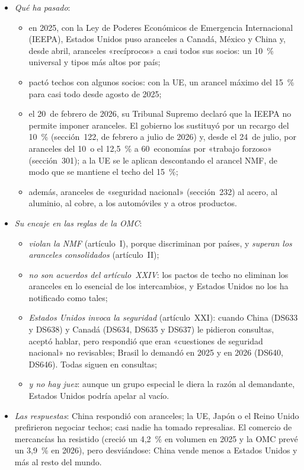 \documentclass[11pt]{article}
\begin{document}
\begin{itemize}
\item \emph{Qué ha pasado}\nocite{JonesDay2026IEEPA,USTR2026Seccion301}:
  \begin{itemize}
  \item en 2025, con la Ley de Poderes Económicos de Emergencia Internacional (IEEPA), Estados Unidos puso aranceles a Canadá, México y China y, desde abril, aranceles «recíprocos» a casi todos sus socios: un 10~\% universal y tipos más altos por país;
  \item pactó techos con algunos socios: con la UE, un arancel máximo del 15~\% para casi todo desde agosto de 2025\nocite{UE2025DeclaracionEEUU};
  \item el 20~de febrero de 2026, su Tribunal Supremo declaró que la IEEPA no permite imponer aranceles\nocite{JonesDay2026IEEPA}. El gobierno los sustituyó por un recargo del 10~\% (sección~122, de febrero a julio de 2026) y, desde el 24~de julio, por aranceles del 10~o el 12,5~\% a 60~economías por «trabajo forzoso» (sección~301); a la UE se le aplican descontando el arancel NMF, de modo que se mantiene el techo del 15~\%;
  \item además, aranceles de «seguridad nacional» (sección~232) al acero, al aluminio, al cobre, a los automóviles y a otros productos.
  \end{itemize}
\item \emph{Su encaje en las reglas de la OMC}:
  \begin{itemize}
  \item \emph{violan la NMF} (artículo~I), porque discriminan por países, y \emph{superan los aranceles consolidados} (artículo~II);
  \item \emph{no son acuerdos del artículo~XXIV}: los pactos de techo no eliminan los aranceles en lo esencial de los intercambios, y Estados Unidos no los ha notificado como tales;
  \item \emph{Estados Unidos invoca la seguridad} (artículo~XXI): cuando China (DS633 y DS638) y Canadá (DS634, DS635 y DS637) le pidieron consultas, aceptó hablar, pero respondió que eran «cuestiones de seguridad nacional» no revisables\nocite{TWN2025DS634}; Brasil lo demandó en 2025 y en 2026 (DS640, DS646). Todas siguen en consultas;
  \item \emph{y no hay juez}: aunque un grupo especial le diera la razón al demandante, Estados Unidos podría apelar al vacío.
  \end{itemize}
\item \emph{Las respuestas}: China respondió con aranceles; la UE, Japón o el Reino Unido prefirieron negociar techos; casi nadie ha tomado represalias. El comercio de mercancías ha resistido (creció un 4,2~\% en volumen en 2025 y la OMC prevé un 3,9~\% en 2026), pero desviándose: China vende menos a Estados Unidos y más al resto del mundo\nocite{OMC2026PrensaOct}.

\end{itemize}
\end{document}
